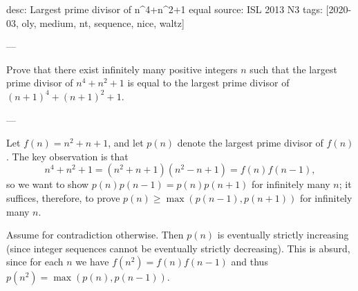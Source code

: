 desc: Largest prime divisor of n^4+n^2+1 equal
source: ISL 2013 N3
tags: [2020-03, oly, medium, nt, sequence, nice, waltz]

---

Prove that there exist infinitely many positive integers $n$ such that the largest prime divisor of $n^4+n^2+1$ is equal to the largest prime divisor of $(n+1)^4+(n+1)^2+1$.

---

Let $f(n)=n^2+n+1$, and let $p(n)$ denote the largest prime divisor of $f(n)$. The key observation is that \[n^4+n^2+1=\left(n^2+n+1\right)\left(n^2-n+1\right)=f(n)f(n-1),\]
so we want to show $p(n)p(n-1)=p(n)p(n+1)$ for infinitely many $n$; it suffices, therefore, to prove $p(n)\ge\max(p(n-1),p(n+1))$ for infinitely many $n$.

Assume for contradiction otherwise. Then $p(n)$ is eventually strictly increasing (since integer sequences cannot be eventually strictly decreasing). This is absurd, since for each $n$ we have $f(n^2)=f(n)f(n-1)$ and thus $p(n^2)=\max(p(n),p(n-1))$.
